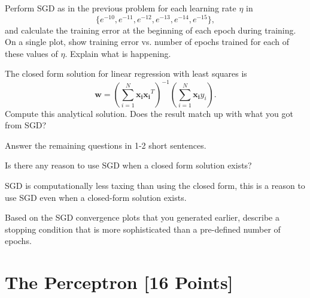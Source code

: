 \begin{problem}[2]
  Perform SGD as in the previous problem for each learning rate $\eta$ in \[\{e^{-10}, e^{-11}, e^{-12}, e^{-13}, e^{-14}, e^{-15}\},\] and calculate the training error at the beginning of each epoch during training.  On a single plot, show training error vs. number of epochs trained for each of these values of $\eta$. Explain what is happening.
\end{problem}
\begin{solution}
  
\end{solution}


\begin{problem}[2]
  The closed form solution for linear regression with least squares is \[\mathbf{w} = \left(\sum_{i=1}^N \mathbf{x_i}\mathbf{x_i}^T\right)^{-1}\left(\sum_{i=1}^N \mathbf{x_i}y_i\right).\]  Compute this analytical solution.  Does the result match up with what you got from SGD?
\end{problem}
\begin{solution}
 
\end{solution}

Answer the remaining questions in 1-2 short sentences.

\begin{problem}[2]
  Is there any reason to use SGD when a closed form solution exists?
\end{problem}
\begin{solution}
  SGD is computationally less taxing than using the closed form, this is a reason to use SGD even when a closed-form solution exists. 
\end{solution}

\begin{problem}[2]
  Based on the SGD convergence plots that you generated earlier, describe a stopping condition that is more sophisticated than a pre-defined number of epochs.
\end{problem}
\begin{solution}
  
\end{solution}



\newpage
\section{The Perceptron [16 Points]}

